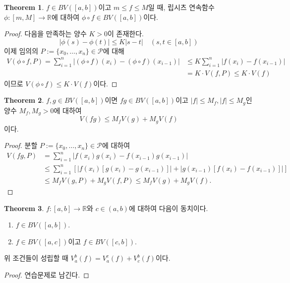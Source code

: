 \documentclass[11pt]{book}
\numberwithin{equation}{chapter}
\def\RR{\mathbb{R}}
\def\calP{\mathcal{P}}
\newcommand{\abs}[1]{\left\vert#1\right\vert}
\theoremstyle{definition}
\newtheorem{thm}{Theorem}[section]
\newenvironment{enum}
	{\begin{enumerate}[label=(\alph*), leftmargin=2\parindent]}
	{\end{enumerate}}
\begin{document}
\begin{thm}
    \(f \in BV([a, b])\)이고 \(m \le f \le M\)일 때, 립시츠 연속함수 \(\phi : [m, M] \to \RR\)에 대하여 \(\phi \circ f \in BV([a, b])\)이다.
\end{thm}
\begin{proof}
    다음을 만족하는 양수 \(K > 0\)이 존재한다.
    \[
        \abs{\phi(s) - \phi(t)} \le K\abs{s - t} \quad (s, t \in [a, b])
    \]
    이제 임의의 \(P := \{x_0, \ldots, x_n\} \in \calP\)에 대해
    \begin{align*}
        V(\phi \circ f, P) = \sum_{i=1}^n \abs{(\phi \circ f)(x_i) - (\phi \circ f)(x_{i-1})} &\le K \sum_{i=1}^n \abs{f(x_i) - f(x_{i-1})}\\
        &= K \cdot V(f, P) \le K \cdot V(f)
    \end{align*}
    이므로 \(V(\phi \circ f) \le K \cdot V(f)\)이다.
\end{proof}

\begin{thm}
    \(f, g \in BV([a, b])\)이면 \(fg \in BV([a, b])\)이고 \(\abs{f} \le M_f, \abs{f} \le M_g\)인 양수 \(M_f, M_g > 0\)에 대하여
    \[
        V(fg) \le M_f V(g) + M_g V(f)
    \]
    이다.
\end{thm}
\begin{proof}
    분할 \(P := \{x_0, \ldots, x_n\} \in \calP\)에 대하여
    \begin{align*}
        V(fg, P) &= \sum_{i=1}^n \abs{f(x_i)g(x_i) - f(x_{i-1})g(x_{i-1})}\\
        &\le \sum_{i=1}^n [\abs{f(x_{i}) [g(x_i) - g(x_{i-1})]} + \abs{g(x_{i-1}) [f(x_i) - f(x_{i-1})]}]\\
        &\le M_f V(g, P) + M_g V(f, P) \le M_f V(g)  + M_g V(f).
    \end{align*}
\end{proof}

\begin{thm}
    \(f : [a, b] \to \RR\)와 \(c \in (a, b)\)에 대하여 다음이 동치이다.
    \begin{enum}
        \item \(f \in BV([a, b])\).
        \item \(f \in BV([a, c])\)이고 \(f \in BV([c, b])\).
    \end{enum}
    위 조건들이 성립할 때 \(V_a^b(f) = V_a^c(f) + V_c^b(f)\)이다.
\end{thm}
\begin{proof}
    연습문제로 남긴다.
\end{proof}
\end{document}
